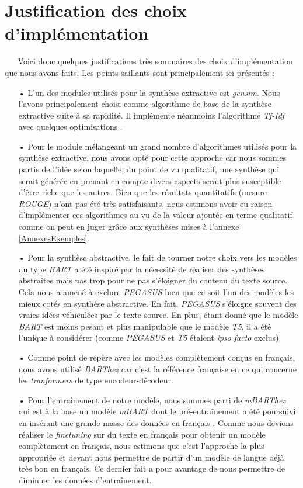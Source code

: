 \section{Justification des choix d'implémentation}
$ _{} $ $ _{} $ $ _{} $ $ _{} $ $ _{} $Voici donc quelques justifications très sommaires des choix d'implémentation que nous avons faits. Les points saillants sont principalement ici présentés :
\begin{itemize}
\item[•] L'un des modules utilisés pour la synthèse extractive est \textit{gensim}. Nous l'avons prin\-ci\-pa\-le\-ment choisi comme algorithme de base de la synthèse extractive suite à sa rapidité. Il implémente néanmoins l'algorithme \textit{Tf-Idf} avec quelques optimisations \cite{srinivasaGENSIMnatural}.
\item[•] Pour le module mélangeant un grand nombre d'algorithmes utilisés pour la synthèse extractive, nous avons opté pour cette approche car nous sommes partis de l'idée selon laquelle, du point de vu qualitatif, une synthèse qui serait générée en prenant en compte divers aspects serait plus susceptible d'être riche que les autres. Bien que les résultats quantitatifs (mesure \textit{ROUGE}) n'ont pas été très satisfaisants, nous estimons avoir eu raison d'implémenter ces algorithmes au vu de la valeur ajoutée en terme qualitatif comme on peut en juger grâce aux synthèses mises à l'annexe \ref{AnnexesExemples}.
\item[•] Pour la synthèse abstractive, le fait de tourner notre choix vers les modèles du type \textit{BART} a été inspiré par la nécessité de réaliser des synthèses abstraites mais pas trop pour ne pas s'éloigner du contenu du texte source. Cela nous a amené à exclure \textit{PEGASUS} bien que ce soit l'un des modèles les mieux cotés en synthèse abstractive. En fait, \textit{PEGASUS} s'éloigne souvent des vraies idées véhiculées par le texte source. En plus, étant donné que le modèle \textit{BART} est moins pesant et plus manipulable que le modèle \textit{T5}, il a été l'unique à considérer (comme \textit{PEGASUS} et \textit{T5} étaient \textit{ipso facto} exclus).
\item[•] Comme point de repère avec les modèles complètement conçus en français, nous avons utilisé \textit{BARThez} car c'est la référence française en ce qui concerne les \textit{tranformers} de type encodeur-décodeur.
\item[•] Pour l'entraînement de notre modèle, nous sommes parti de \textit{mBARThez} qui est à la base un modèle \textit{mBART} dont le pré-entraînement a été poursuivi en insérant une grande masse des données en français \cite{eddine2020barthez}. Comme nous devions réaliser le \textit{finetuning} sur du texte en français pour obtenir un modèle complètement en français, nous estimons que c'est l'approche la plus appropriée et devant nous permettre de partir d'un modèle de langue déjà très bon en français. Ce dernier fait a pour avantage de nous permettre de diminuer les données d'entraînement.

\end{itemize}
